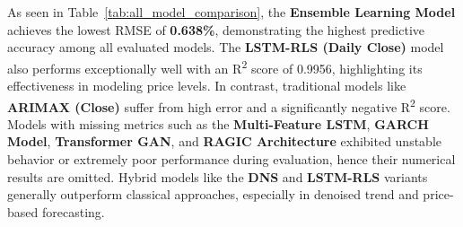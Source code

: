 \noindent As seen in Table~\ref{tab:all_model_comparison}, the \textbf{Ensemble Learning Model} achieves the lowest RMSE of \textbf{0.638\%}, demonstrating the highest predictive accuracy among all evaluated models. The \textbf{LSTM-RLS (Daily Close)} model also performs exceptionally well with an R\textsuperscript{2} score of 0.9956, highlighting its effectiveness in modeling price levels. In contrast, traditional models like \textbf{ARIMAX (Close)} suffer from high error and a significantly negative R\textsuperscript{2} score. Models with missing metrics such as the \textbf{Multi-Feature LSTM}, \textbf{GARCH Model}, \textbf{Transformer GAN}, and \textbf{RAGIC Architecture} exhibited unstable behavior or extremely poor performance during evaluation, hence their numerical results are omitted. Hybrid models like the \textbf{DNS} and \textbf{LSTM-RLS} variants generally outperform classical approaches, especially in denoised trend and price-based forecasting.
